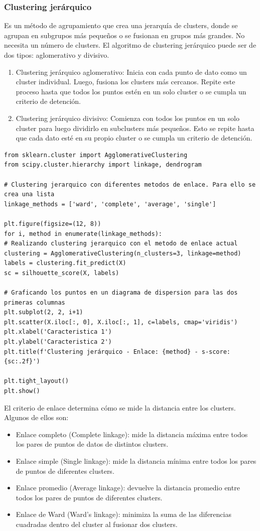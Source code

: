 \documentclass[a4paper, 12pt]{book}
\begin{document}
\subsubsection{Clustering jerárquico}
Es un método de agrupamiento que crea una jerarquía de clusters, donde se agrupan en subgrupos más pequeños o se fusionan en grupos más grandes. No necesita un número de clusters. El algoritmo de clustering jerárquico puede ser de dos tipos: aglomerativo y divisivo.
\begin{enumerate}
	\item Clustering jerárquico aglomerativo: Inicia con cada punto de dato como un cluster individual. Luego, fusiona los clusters más cercanos. Repite este proceso hasta que todos los puntos estén en un solo cluster o se cumpla un criterio de detención.
	\item Clustering jerárquico divisivo: Comienza con todos los puntos en un solo cluster para luego dividirlo en subclusters más pequeños. Esto se repite hasta que cada dato esté en su propio cluster o se cumpla un criterio de detención.
\end{enumerate}
\begin{verbatim}
from sklearn.cluster import AgglomerativeClustering
from scipy.cluster.hierarchy import linkage, dendrogram

# Clustering jerarquico con diferentes metodos de enlace. Para ello se crea una lista
linkage_methods = ['ward', 'complete', 'average', 'single']

plt.figure(figsize=(12, 8))
for i, method in enumerate(linkage_methods):
# Realizando clustering jerarquico con el metodo de enlace actual
clustering = AgglomerativeClustering(n_clusters=3, linkage=method)
labels = clustering.fit_predict(X)
sc = silhouette_score(X, labels)

# Graficando los puntos en un diagrama de dispersion para las dos primeras columnas
plt.subplot(2, 2, i+1)
plt.scatter(X.iloc[:, 0], X.iloc[:, 1], c=labels, cmap='viridis')
plt.xlabel('Caracteristica 1')
plt.ylabel('Caracteristica 2')
plt.title(f'Clustering jerárquico - Enlace: {method} - s-score: {sc:.2f}')

plt.tight_layout()
plt.show()
\end{verbatim}
El criterio de enlace determina cómo se mide la distancia entre los clusters. Algunos de ellos son:
\begin{itemize}
	\item Enlace completo (Complete linkage): mide la distancia máxima entre todos los pares de puntos de datos de distintos clusters.
	\item Enlace simple (Single linkage): mide la distancia mínima entre todos los pares de puntos de diferentes clusters.
	\item Enlace promedio (Average linkage): devuelve la distancia promedio entre todos los pares de puntos de diferentes clusters.
	\item Enlace de Ward (Ward's linkage): minimiza la suma de las diferencias cuadradas dentro del cluster al fusionar dos clusters.
\end{itemize}
\end{document}
